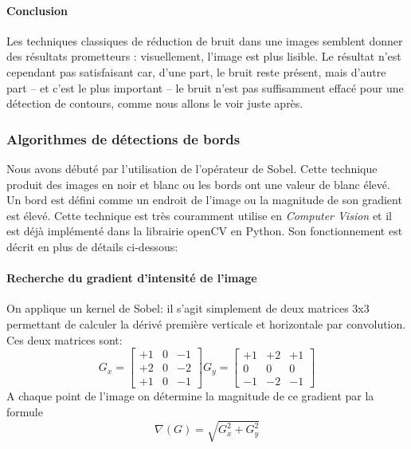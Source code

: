 \documentclass[a4paper, 12pt, titlepage, oneside, french]{article}
\begin{document}
	\newpage
	\paragraph{\textbf{Conclusion}}
	Les techniques classiques de réduction de bruit dans une images semblent donner des résultats prometteurs : visuellement, l'image est plus lisible. Le résultat n'est cependant pas satisfaisant car, d'une part, le bruit reste présent, mais d'autre part -- et c'est le plus important -- le bruit n'est pas suffisamment effacé pour une détection de contours, comme nous allons le voir juste après.

	\newpage

	\subsubsection{Algorithmes de détections de bords}
	Nous avons débuté par l'utilisation de l'opérateur de Sobel\cite{SobelOp}. Cette technique produit des images en noir et blanc ou les bords ont une valeur de blanc élevé. Un bord est défini comme un endroit de l'image ou la magnitude de son gradient est élevé. Cette technique est très couramment utilise en \textit{Computer Vision} et il est déjà implémenté dans la librairie openCV en Python. Son fonctionnement est décrit en plus de détails ci-dessous: 
		\paragraph{\textbf{Recherche du gradient d'intensité de l'image}}
				On applique un kernel de Sobel: il s'agit simplement de deux matrices 3x3 permettant de calculer la dérivé première verticale et horizontale par convolution. Ces deux matrices sont:
				\\ \[G_x = \begin{bmatrix}  +1  & 0 & -1 \\ +2 & 0 & -2  \\ +1 &  0 & -1\end{bmatrix} 
					G_y = \begin{bmatrix} +1 & +2 & +1  \\  0 & 0 &  0  \\ -1 & -2 & -1\end{bmatrix}\]
						A chaque point de l'image on détermine la magnitude de ce gradient par la formule
					\[\nabla(G) = \sqrt{G_x^2 + G_y^2}\]
\end{document}
